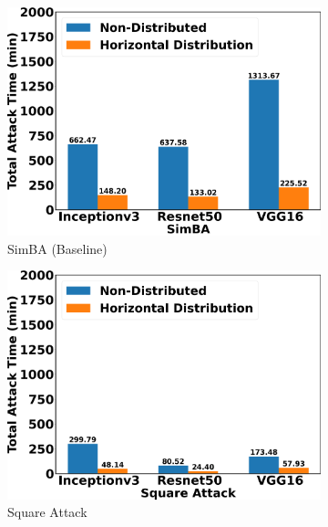 \begin{figure}[tbhp]
\centering
\begin{subfigure}[b]{0.32\textwidth}
    \centering
    \includegraphics[width=\textwidth]{figures/chapter_classification/simba_attack_horizontal_time.png}
    \caption{SimBA (Baseline)}
    \label{fig:simba_horizon}
\end{subfigure}
\hfill
\begin{subfigure}[b]{0.32\textwidth}
    \centering
    \includegraphics[width=\textwidth]{figures/chapter_classification/square_attack_horizontal_time.png}
    \caption{Square Attack}
    \label{fig:square_horizon}
\end{subfigure}
\hfill
\begin{subfigure}[b]{0.32\textwidth}
    \centering

\end{subfigure}
\end{figure}
